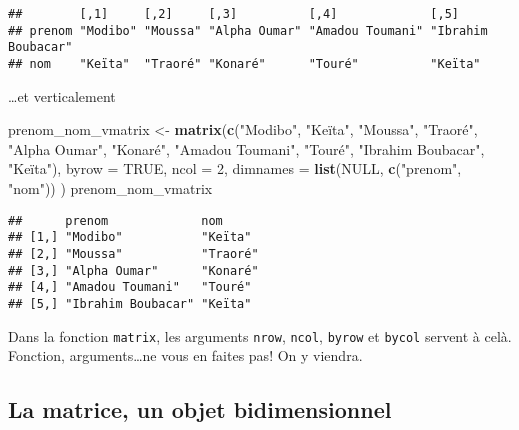 \documentclass[]{book}
\newenvironment{Shaded}{\begin{snugshade}}{\end{snugshade}}
\newcommand{\KeywordTok}[1]{\textcolor[rgb]{0.13,0.29,0.53}{\textbf{#1}}}
\newcommand{\DataTypeTok}[1]{\textcolor[rgb]{0.13,0.29,0.53}{#1}}
\newcommand{\DecValTok}[1]{\textcolor[rgb]{0.00,0.00,0.81}{#1}}
\newcommand{\StringTok}[1]{\textcolor[rgb]{0.31,0.60,0.02}{#1}}
\newcommand{\OtherTok}[1]{\textcolor[rgb]{0.56,0.35,0.01}{#1}}
\newcommand{\NormalTok}[1]{#1}
\begin{document}
\begin{verbatim}
##        [,1]     [,2]     [,3]          [,4]             [,5]              
## prenom "Modibo" "Moussa" "Alpha Oumar" "Amadou Toumani" "Ibrahim Boubacar"
## nom    "Keïta"  "Traoré" "Konaré"      "Touré"          "Keïta"
\end{verbatim}

\ldots{}et verticalement

\begin{Shaded}
\begin{Highlighting}[]
\NormalTok{prenom_nom_vmatrix <-}\StringTok{ }\KeywordTok{matrix}\NormalTok{(}\KeywordTok{c}\NormalTok{(}\StringTok{"Modibo"}\NormalTok{, }\StringTok{"Keïta"}\NormalTok{,}
                               \StringTok{"Moussa"}\NormalTok{, }\StringTok{"Traoré"}\NormalTok{,}
                               \StringTok{"Alpha Oumar"}\NormalTok{, }\StringTok{"Konaré"}\NormalTok{, }
                               \StringTok{"Amadou Toumani"}\NormalTok{, }\StringTok{"Touré"}\NormalTok{, }
                               \StringTok{"Ibrahim Boubacar"}\NormalTok{, }\StringTok{"Keïta"}\NormalTok{),}
                             \DataTypeTok{byrow =} \OtherTok{TRUE}\NormalTok{,}
                             \DataTypeTok{ncol =} \DecValTok{2}\NormalTok{,}
                             \DataTypeTok{dimnames =} \KeywordTok{list}\NormalTok{(}\OtherTok{NULL}\NormalTok{, }\KeywordTok{c}\NormalTok{(}\StringTok{"prenom"}\NormalTok{, }\StringTok{"nom"}\NormalTok{))}
\NormalTok{                             )}
\NormalTok{prenom_nom_vmatrix}
\end{Highlighting}
\end{Shaded}

\begin{verbatim}
##      prenom             nom     
## [1,] "Modibo"           "Keïta" 
## [2,] "Moussa"           "Traoré"
## [3,] "Alpha Oumar"      "Konaré"
## [4,] "Amadou Toumani"   "Touré" 
## [5,] "Ibrahim Boubacar" "Keïta"
\end{verbatim}

Dans la fonction \texttt{matrix}, les arguments \texttt{nrow},
\texttt{ncol}, \texttt{byrow} et \texttt{bycol} servent à celà.
Fonction, arguments\ldots{}ne vous en faites pas! On y viendra.

\subsection{La matrice, un objet
bidimensionnel}\label{la-matrice-un-objet-bidimensionnel}
\end{document}
